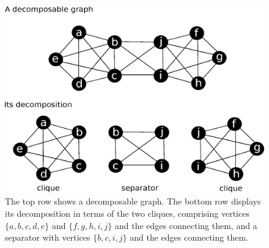 \documentclass[a4paper]{article}
\begin{document}
\begin{figure}[h!]
\begin{center}
\includegraphics[angle=0, scale=0.45]{DecomposableGraph.eps}
\end{center}
\caption{The top row shows a decomposable graph. The bottom row displays its decomposition in terms of the two cliques, comprising vertices $\{a, b, c, d, e\}$ and $\{f, g, h, i, j\}$ and the edges connecting them, and a separator with vertices $\{b, c, i, j\}$ and the edges connecting them.
\label{fig.decomposableGraphIllustration}}
\end{figure}
\end{document}
